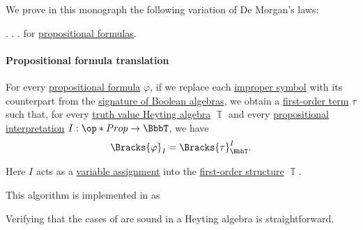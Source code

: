 \begin{remark}\label{rem:de_morgans_laws}
  We prove in this monograph the following variation of De Morgan's laws:
  \begin{thmenum}
     .
     .
     .
      for \hyperref[def:propositional_formula]{propositional formulas}.
  \end{thmenum}
\end{remark}

\paragraph{Propositional formula translation}

\begin{algorithm}\label{alg:propositional_formula_to_heyting_term}
  For every \hyperref[def:propositional_formula]{propositional formula} \( \varphi \), if we replace each \hyperref[con:improper_symbol]{improper symbol} with its counterpart from the \hyperref[def:boolean_algebra/theory]{signature of Boolean algebras}, we obtain a \hyperref[def:fol_term]{first-order term} \( \tau \) such that, for every \hyperref[def:truth_value_algebra]{truth value Heyting algebra} \( \BbbT \) and every \hyperref[def:propositional_interpretation]{propositional interpretation} \( I: \op*{Prop} \to \BbbT \), we have
  \begin{equation*}
    \Bracks{\varphi}_I = \Bracks{\tau}_\BbbT^I.
  \end{equation*}
\end{algorithm}
\begin{comments}
  \item Here \( I \) acts as a \hyperref[def:fol_variable_assignment]{variable assignment} into the \hyperref[def:fol_structure]{first-order structure} \( \BbbT \).

  \item This algorithm is implemented in \cite{notebook:code} as
  \begin{CodeRefDisplay}
  \end{CodeRefDisplay}
\end{comments}
\begin{defproof}
  Verifying that the cases of  are sound in a Heyting algebra is straightforward.
\end{defproof}

